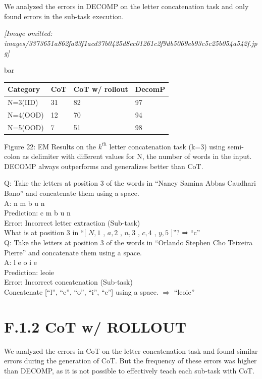 \documentclass[
]{article}
\newcounter{none} %
\begin{document}
We analyzed the errors in DECOMP on the letter concatenation task and
only found errors in the sub-task execution.

\textit{[Image omitted: images/3373651a862fa23f1acd37b0425d8ec01261c2f9db5069eb93c5c25b054a542f.jpg]}

bar

{\def\LTcaptype{none} %
\begin{longtable}[]{@{}llll@{}}
\toprule\noalign{}
Category & CoT & CoT w/ rollout & DecomP \\
\midrule\noalign{}
\endhead
\bottomrule\noalign{}
\endlastfoot
N=3(IID) & 31 & 82 & 97 \\
N=4(OOD) & 12 & 70 & 94 \\
N=5(OOD) & 7 & 51 & 98 \\
\end{longtable}
}

Figure 22: EM Results on the \(k^{th}\) letter concatenation task (k=3)
using semi-colon as delimiter with different values for N, the number of
words in the input. DECOMP always outperforms and generalizes better
than CoT.

Q: Take the letters at position 3 of the words in ``Nancy Samina Abbas
Caudhari Bano'' and concatenate them using a space.\\
A: n m b u n\\
Prediction: c m b u n\\
Error: Incorrect letter extraction (Sub-task)\\
What is at position 3 in ``{[} \(N, 1\) , \(a, 2\) , \(n, 3\) , \(c, 4\)
, \(y, 5\) {]}''? ⇒ ``c''\\
Q: Take the letters at position 3 of the words in ``Orlando Stephen Cho
Teixeira Pierre'' and concatenate them using a space.\\
A: l e o i e\\
Prediction: leoie\\
Error: Incorrect concatenation (Sub-task)\\
Concatenate {[}``l'', ``e'', ``o'', ``i'', ``e''{]} using a space.
\(\Rightarrow\) ``leoie''

\section{F.1.2 CoT w/ ROLLOUT}\label{f.1.2-cot-w-rollout}

We analyzed the errors in CoT on the letter concatenation task and found
similar errors during the generation of CoT. But the frequency of these
errors was higher than DECOMP, as it is not possible to effectively
teach each sub-task with CoT.
\end{document}
